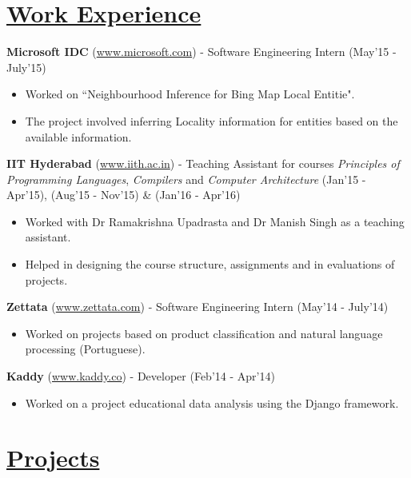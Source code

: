 \documentclass[8pt]{extarticle}
\newcommand{\heading}[1]{
\section*{\color{red}\underline{#1}}
}
\begin{document}
\heading{Work Experience}

\textbf{Microsoft IDC} (\url{www.microsoft.com}) - Software Engineering Intern \hfill (May'15 - July'15)
\begin{itemize}
\item Worked on ``Neighbourhood Inference for Bing Map Local Entitie".
\item The project involved inferring Locality information for entities based on the available information.
\end{itemize}
\space
\textbf{IIT Hyderabad} (\url{www.iith.ac.in}) - Teaching Assistant for courses \textit{Principles of Programming Languages}, \textit{Compilers} and \textit{Computer Architecture} \hfill (Jan'15 - Apr'15), (Aug'15 - Nov'15) \& (Jan'16 - Apr'16)
\begin{itemize}
\item Worked with Dr Ramakrishna Upadrasta and Dr Manish Singh as a teaching assistant.
\item Helped in designing the course structure, assignments and in evaluations of projects.
\end{itemize}
\space
\textbf{Zettata} (\url{www.zettata.com}) - Software Engineering Intern \hfill (May'14 - July'14)
\begin{itemize}
\item Worked on projects based on product classification and natural language processing (Portuguese).
\end{itemize}
\space
\textbf{Kaddy} (\url{www.kaddy.co}) - Developer \hfill (Feb'14 - Apr'14)
\begin{itemize}
\item Worked on a project educational data analysis using the Django framework.
\end{itemize}

\heading{Projects}
\end{document}

